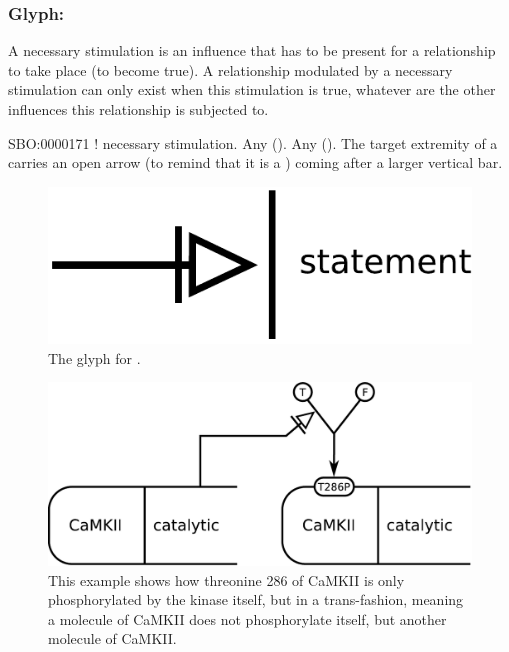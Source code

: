 \color{ForestGreen}

\subsubsection{Glyph: }\label{sec:necessaryStimulation}

A necessary stimulation is an influence that has to be present for a relationship to take place (to become true). A relationship modulated by a necessary stimulation can only exist when this stimulation is true, whatever are the other influences this relationship is subjected to.

\begin{glyphDescription}
 \glyphSboTerm SBO:0000171 ! necessary stimulation.
 \glyphOrigin Any  ().
 \glyphTarget Any  ().
 \glyphEndPoint The target extremity of a  carries an open arrow (to remind that it is a ) coming after a larger vertical bar.
 \end{glyphDescription}

\begin{figure}[H]
  \centering
  \includegraphics[scale = 0.5]{images/necessaryStimulation}
  \caption{The \PD glyph for .}
  \label{fig:necessaryStimulation}
\end{figure}

\begin{figure}[H]
  \centering
  \includegraphics[scale = 0.5]{examples/ex-necessaryStimulation}
  \caption{This example shows how threonine 286 of CaMKII is only phosphorylated by the kinase itself, but in a trans-fashion, meaning a molecule of CaMKII does not phosphorylate itself, but another molecule of CaMKII.}
  \label{fig:ex-necessaryStimulation}
\end{figure}

\normalcolor